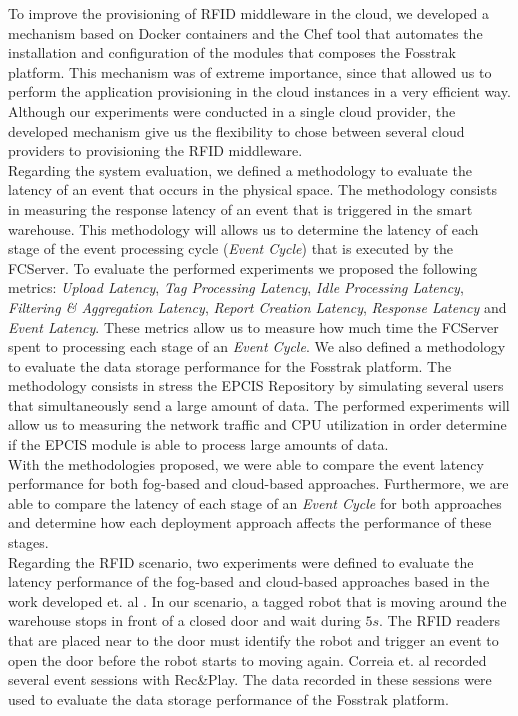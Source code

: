 To improve the provisioning of \gls{RFID} middleware in the cloud, we developed a mechanism based on
Docker containers and the Chef tool that automates the installation and configuration of the modules
that composes the Fosstrak platform. This mechanism was of extreme importance, since that allowed us
to perform the application provisioning in the cloud instances in a very efficient way. Although our
experiments were conducted in a single cloud provider, the developed mechanism give us the flexibility
to chose between several cloud providers to provisioning the \gls{RFID} middleware.\\

Regarding the system evaluation, we defined a methodology to evaluate the latency of an event that
occurs in the physical space. The methodology consists in measuring the response latency
of an event that is triggered in the smart warehouse. This methodology will allows us to determine
the latency of each stage of the event processing cycle (\textit{Event Cycle}) that is executed by the
FCServer. To evaluate the performed experiments we proposed the following metrics: \textit{Upload Latency},
\textit{Tag Processing Latency}, \textit{Idle Processing Latency}, \textit{Filtering \& Aggregation Latency},
\textit{Report Creation Latency}, \textit{Response Latency} and \textit{Event Latency}. These metrics allow
us to measure how much time the FCServer spent to processing each stage of an \textit{Event Cycle}.
We also defined a methodology to evaluate the data storage performance for the Fosstrak platform.
The methodology consists in stress the \gls{EPCIS} Repository by simulating several users that simultaneously
send a large amount of data. The performed experiments will allow us to measuring the network traffic
and CPU utilization in order determine if the EPCIS module is able to process large amounts of data.\\

With the methodologies proposed, we were able to compare the event latency performance for both
fog-based and cloud-based approaches. Furthermore, we are able to compare the latency of each stage
of an \textit{Event Cycle} for both approaches and determine how each deployment approach affects the
performance of these stages.\\

Regarding the \gls{RFID} scenario, two experiments were defined to evaluate the latency performance
of the fog-based and cloud-based approaches based in the work developed et. al \cite{Correia:Thesis:2014}.
In our scenario, a tagged robot that is moving around the warehouse stops in front of a closed door and
wait during $5s$. The \gls{RFID} readers that are placed near to the door must identify the robot and
trigger an event to open the door before the robot starts to moving again. Correia et. al \cite{Correia:Thesis:2014}
recorded several event sessions with Rec\&Play. The data recorded in these sessions were used to
evaluate the data storage performance of the Fosstrak platform.\\

